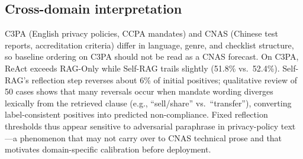 \subsection{Cross-domain interpretation}
\label{app:tier2_caution}

C3PA (English privacy policies, CCPA mandates) and CNAS (Chinese test reports, accreditation criteria) differ in language, genre, and checklist structure, so baseline ordering on C3PA should not be read as a CNAS forecast. On C3PA, ReAct exceeds RAG-Only while Self-RAG trails slightly (51.8\% vs.\ 52.4\%). Self-RAG's reflection step reverses about 6\% of initial positives; qualitative review of 50 cases shows that many reversals occur when mandate wording diverges lexically from the retrieved clause (e.g., ``sell/share'' vs.\ ``transfer''), converting label-consistent positives into predicted non-compliance. Fixed reflection thresholds thus appear sensitive to adversarial paraphrase in privacy-policy text---a phenomenon that may not carry over to CNAS technical prose and that motivates domain-specific calibration before deployment.
